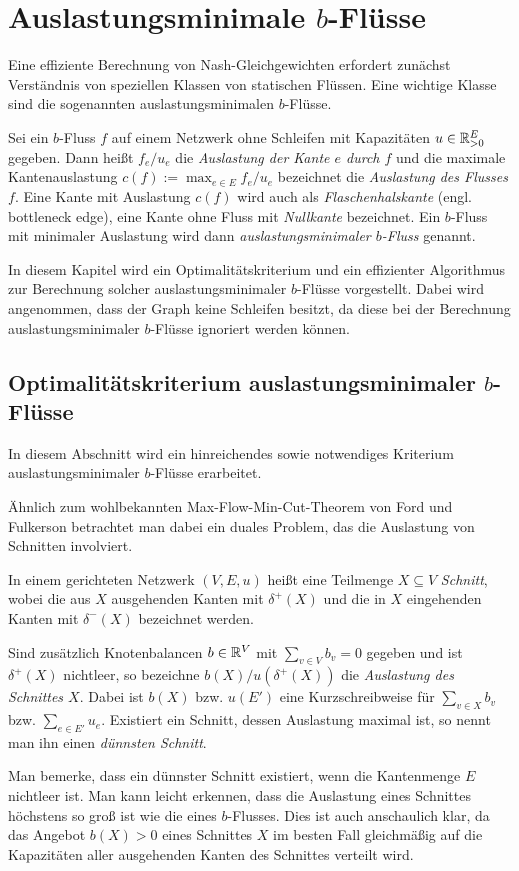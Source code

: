 \chapter{Auslastungsminimale $b$-Flüsse}

Eine effiziente Berechnung von Nash-Gleichgewichten erfordert zunächst Verständnis von speziellen Klassen von statischen Flüssen.
Eine wichtige Klasse sind die sogenannten auslastungsminimalen $b$-Flüsse.

\begin{definition}
	Sei ein $b$-Fluss $f$ auf einem Netzwerk ohne Schleifen mit Kapazitäten $u\in\mathbb{R}_{>0}^E$ gegeben.
	Dann heißt $f_e/u_e$ die \emph{Auslastung der Kante $e$ durch $f$} und die maximale Kantenauslastung $c(f):=\max_{e\in E} f_e/u_e$ bezeichnet die \emph{Auslastung des Flusses $f$}.
	Eine Kante mit Auslastung $c(f)$ wird auch als \emph{Flaschenhalskante} (engl. bottleneck edge), eine Kante ohne Fluss mit \emph{Nullkante} bezeichnet.
	Ein $b$-Fluss mit minimaler Auslastung wird dann \emph{auslastungsminimaler $b$-Fluss} genannt.
\end{definition}

In diesem Kapitel wird ein Optimalitätskriterium und ein effizienter Algorithmus zur Berechnung solcher auslastungsminimaler $b$-Flüsse vorgestellt.
Dabei wird angenommen, dass der Graph keine Schleifen besitzt, da diese bei der Berechnung auslastungsminimaler $b$-Flüsse ignoriert werden können.

\section{Optimalitätskriterium auslastungsminimaler $b$-Flüsse}

In diesem Abschnitt wird ein hinreichendes sowie notwendiges Kriterium auslastungsminimaler $b$-Flüsse erarbeitet.

Ähnlich zum wohlbekannten Max-Flow-Min-Cut-Theorem von Ford und Fulkerson betrachtet man dabei ein duales Problem, das die Auslastung von Schnitten involviert.

\begin{definition}[Schnitt]
	In einem gerichteten Netzwerk $(V, E, u)$ heißt eine Teilmenge $X\subseteq V$ \emph{Schnitt}, wobei die aus $X$ ausgehenden Kanten mit $\delta^+(X)$ und die in $X$ eingehenden Kanten mit $\delta^-(X)$ bezeichnet werden.
	
	Sind zusätzlich Knotenbalancen $b\in\mathbb{R}^V$ mit $\sum_{v\in V} b_v = 0$ gegeben und ist $\delta^+(X)$ nichtleer, so bezeichne $b(X) / u(\delta^+(X))$ die \emph{Auslastung des Schnittes $X$}.
	Dabei ist $b(X)$ bzw. $u(E')$ eine Kurzschreibweise für $\sum_{v\in X} b_v$ bzw. $\sum_{e\in E'} u_e$.
	Existiert ein Schnitt, dessen Auslastung maximal ist, so nennt man ihn einen \emph{dünnsten Schnitt}.
\end{definition}
Man bemerke, dass ein dünnster Schnitt existiert, wenn die Kantenmenge $E$ nichtleer ist.
Man kann leicht erkennen, dass die Auslastung eines Schnittes höchstens so groß ist wie die eines $b$-Flusses.
Dies ist auch anschaulich klar, da das Angebot $b(X) > 0$ eines Schnittes $X$ im besten Fall gleichmäßig auf die Kapazitäten aller ausgehenden Kanten des Schnittes verteilt wird.

